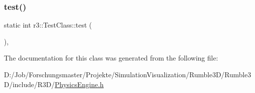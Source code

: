 \subsubsection{\texorpdfstring{test()}{test()}}
{\footnotesize\ttfamily static int r3\+::\+Test\+Class\+::test (\begin{DoxyParamCaption}{ }\end{DoxyParamCaption})\hspace{0.3cm}{\ttfamily [inline]}, {\ttfamily [static]}}



The documentation for this class was generated from the following file\+:\begin{DoxyCompactItemize}
\item 
D\+:/\+Job/\+Forschungsmaster/\+Projekte/\+Simulation\+Visualization/\+Rumble3\+D/\+Rumble3\+D/include/\+R3\+D/\mbox{\hyperlink{_physics_engine_8h}{Physics\+Engine.\+h}}\end{DoxyCompactItemize}
